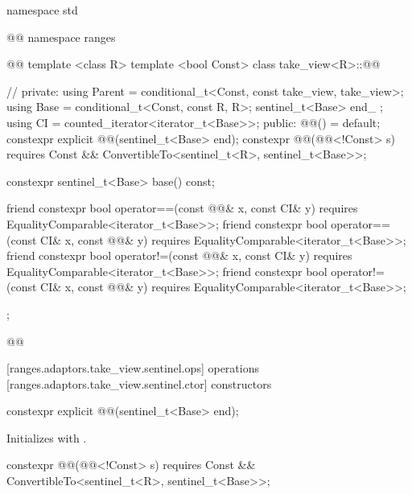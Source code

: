 \begin{codeblock}
namespace std { @@ namespace ranges { @@
  template <class R>
  template <bool Const>
  class take_view<R>::@@ { // \expos
  private:
    using Parent = conditional_t<Const, const take_view, take_view>;
    using Base = conditional_t<Const, const R, R>;
    sentinel_t<Base> end_ {};
    using CI = counted_iterator<iterator_t<Base>>;
  public:
    @@() = default;
    constexpr explicit @@(sentinel_t<Base> end);
    constexpr @@(@@<!Const> s)
      requires Const && ConvertibleTo<sentinel_t<R>, sentinel_t<Base>>;

    constexpr sentinel_t<Base> base() const;

    friend constexpr bool operator==(const @@& x, const CI& y)
      requires EqualityComparable<iterator_t<Base>>;
    friend constexpr bool operator==(const CI& x, const @@& y)
      requires EqualityComparable<iterator_t<Base>>;
    friend constexpr bool operator!=(const @@& x, const CI& y)
      requires EqualityComparable<iterator_t<Base>>;
    friend constexpr bool operator!=(const CI& x, const @@& y)
      requires EqualityComparable<iterator_t<Base>>;
  };
}}@\removed{\}\}}@
\end{codeblock}

[ranges.adaptors.take_view.sentinel.ops]{ operations}
[ranges.adaptors.take_view.sentinel.ctor]{ constructors}

\begin{itemdecl}
constexpr explicit @@(sentinel_t<Base> end);
\end{itemdecl}

\begin{itemdescr}
\pnum
\effects Initializes  with .
\end{itemdescr}

%
\begin{itemdecl}
constexpr @@(@@<!Const> s)
  requires Const && ConvertibleTo<sentinel_t<R>, sentinel_t<Base>>;
\end{itemdecl}

